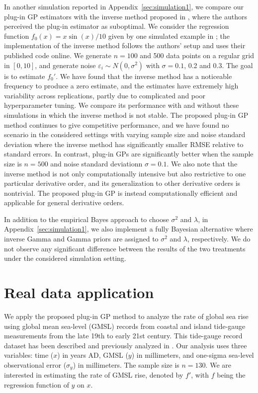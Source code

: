 \documentclass[12pt]{article}
\theoremstyle{plain}
\theoremstyle{nonitalicremark}
\begin{document}
In another simulation reported in Appendix~\ref{sec:simulation1}, we compare our plug-in GP estimators with the inverse method proposed in \cite{holsclaw2013gaussian}, where the authors perceived the plug-in estimator as suboptimal. We consider the regression function $f_0 (x) = x \sin(x)/10$ given by one simulated example in \cite{holsclaw2013gaussian}; the implementation of the inverse method follows the authors' setup and uses their published code online. We generate $n = 100$ and 500 data points on a regular grid in $[0, 10]$, and generate noise $\varepsilon_i\sim N(0, \sigma^2)$ with $\sigma = 0.1$, 0.2 and 0.3. The goal is to estimate $f_0'$. We have found that the inverse method has a noticeable frequency to produce a zero estimate, and the estimates have extremely high variability across replications, partly due to complicated and poor hyperparameter tuning. We compare its performance with and without these simulations in which the inverse method is not stable. The proposed plug-in GP method continues to give competitive performance, and we have found no scenario in the considered settings with varying sample size and noise standard deviation where the inverse method has significantly smaller RMSE relative to standard errors. In contrast, plug-in GPs are significantly better when the sample size is $n = 500$ and noise standard deviationn $\sigma = 0.1$. We also note that the inverse method is not only computationally intensive but also restrictive to one particular derivative order, and its generalization to other derivative orders is nontrivial. The proposed plug-in GP is instead computationally efficient and applicable for general derivative orders. 

In addition to the empirical Bayes approach to choose $\sigma^2$ and $\lambda$, in Appendix~\ref{sec:simulation1}, we also implement a fully Bayesian alternative where inverse Gamma and Gamma priors are assigned to $\sigma^2$ and $\lambda$, respectively. We do not observe any significant difference between the results of the two treatments under the considered simulation setting.



\section{Real data application}


We apply the proposed plug-in GP method to analyze the rate of global sea rise using global mean sea-level (GMSL) records from coastal and island tide-gauge measurements from the late 19th to early 21st century. This tide-gauge record dataset has been described and previously analyzed in \cite{church200620th,church2011sea}. Our analysis uses three variables: time ($x$) in years AD, GMSL ($y$) in millimeters, and one-sigma sea-level observational error ($\sigma_y$) in millimeters. The sample size is $n = 130$. We are interested in estimating the rate of GMSL rise, denoted by $f'$, with $f$ being the regression function of $y$ on $x$. 
\end{document}
